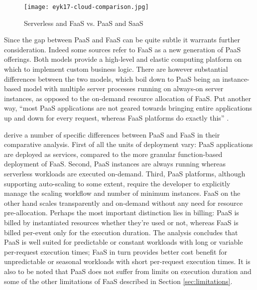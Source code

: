 \begin{figure}[h]
  \centering
  \texttt{[image: eyk17-cloud-comparison.jpg]}
  \caption{Serverless and FaaS vs. PaaS and SaaS \parencite{van2017spec}}
  \label{fig:cloudSpectrum}
\end{figure}

Since the gap between PaaS and FaaS can be quite subtle it warrants further consideration. Indeed some sources \parencite[e.g.][]{adzic2017serverless} refer to FaaS as a new generation of PaaS offerings. Both models provide a high-level and elastic computing platform on which to implement custom business logic. There are however substantial differences between the two models, which boil down to PaaS being an instance-based model with multiple server processes running on always-on server instances, as opposed to the on-demand resource allocation of FaaS. Put another way, ``most PaaS applications are not geared towards bringing entire applications up and down for every request, whereas FaaS platforms do exactly this'' \parencite{robert2016serverlessarchitectures}.

\textcite{albuquerque17faaspaas} derive a number of specific differences between PaaS and FaaS in their comparative analysis. First of all the units of deployment vary: PaaS applications are deployed as services, compared to the more granular function-based deployment of FaaS. Second, PaaS instances are always running whereas serverless workloads are executed on-demand. Third, PaaS platforms, although supporting auto-scaling to some extent, require the developer to explicitly manage the scaling workflow and number of minimum instances. FaaS on the other hand scales transparently and on-demand without any need for resource pre-allocation. Perhaps the most important distinction lies in billing: PaaS is billed by instantiated resources whether they're used or not, whereas FaaS is billed per-event only for the execution duration. The analysis concludes that PaaS is well suited for predictable or constant workloads with long or variable per-request execution times; FaaS in turn provides better cost benefit for unpredictable or seasonal workloads with short per-request execution times. It is also to be noted that PaaS does not suffer from limits on execution duration and some of the other limitations of FaaS described in Section \ref{sec:limitations}.

